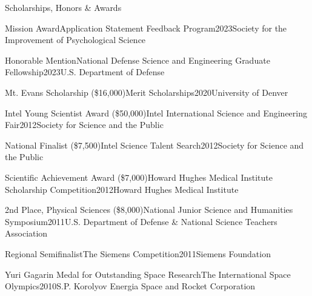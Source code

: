 \documentclass{cv} %
\begin{document}
\begin{cvSection}{Scholarships, Honors \& Awards}

  \begin{cvSubsectionAwards}{Mission Award}{Application Statement Feedback Program}{2023}{Society for the Improvement of Psychological Science}
  \end{cvSubsectionAwards}

  \begin{cvSubsectionAwards}{Honorable Mention}{National Defense Science and Engineering Graduate Fellowship}{2023}{U.S. Department of Defense}
  \end{cvSubsectionAwards}

  \begin{cvSubsectionAwards}{Mt. Evans Scholarship (\$16,000)}{Merit Scholarships}{2020}{University of Denver}
  \end{cvSubsectionAwards}

  \begin{cvSubsectionAwards}{Intel Young Scientist Award (\$50,000)}{Intel International Science and Engineering Fair}{2012}{Society for Science and the Public}
  \end{cvSubsectionAwards}

  \begin{cvSubsectionAwards}{National Finalist (\$7,500)}{Intel Science Talent Search}{2012}{Society for Science and the Public}
  \end{cvSubsectionAwards}

  \begin{cvSubsectionAwards}{Scientific Achievement Award (\$7,000)}{Howard Hughes Medical Institute Scholarship Competition}{2012}{Howard Hughes Medical Institute}
  \end{cvSubsectionAwards}

  \begin{cvSubsectionAwards}{2nd Place, Physical Sciences (\$8,000)}{National Junior Science and Humanities Symposium}{2011}{U.S. Department of Defense \& National Science Teachers Association}
  \end{cvSubsectionAwards}

  \begin{cvSubsectionAwards}{Regional Semifinalist}{The Siemens Competition}{2011}{Siemens Foundation}
  \end{cvSubsectionAwards}

  \begin{cvSubsectionAwards}{Yuri Gagarin Medal for Outstanding Space Research}{The International Space Olympics}{2010}{S.P. Korolyov Energia Space and Rocket Corporation}
  \end{cvSubsectionAwards}

\end{cvSection}
\end{document}
